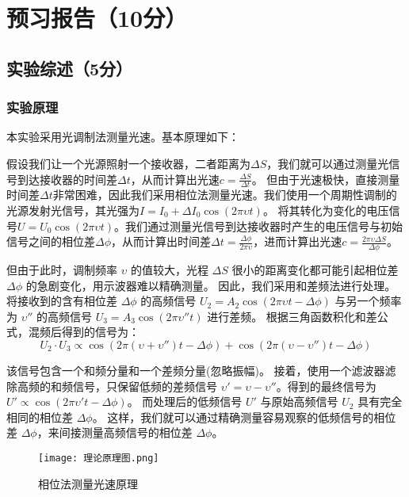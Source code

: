\documentclass{Preport}
\begin{document}
\setcounter{page}{0}
\makecover

\section{预习报告（10分）}
\subsection{实验综述（5分）}
\subsubsection{实验原理}
本实验采用光调制法测量光速。基本原理如下：

假设我们让一个光源照射一个接收器，二者距离为$\Delta S$，我们就可以通过测量光信号到达接收器的时间差$\Delta t$，从而计算出光速$c=\frac{\Delta S}{\Delta t}$。
但由于光速极快，直接测量时间差$\Delta t$非常困难，因此我们采用相位法测量光速。我们使用一个周期性调制的光源发射光信号，其光强为$I=I_0 +\Delta I_0 \cos(2\pi \upsilon t)$。
将其转化为变化的电压信号$U=U_0 \cos(2\pi \upsilon t)$。我们通过测量光信号到达接收器时产生的电压信号与初始信号之间的相位差$\Delta \phi$，从而计算出时间差$\Delta t=\frac{\Delta \phi}{2\pi \upsilon }$，进而计算出光速$c=\frac{2\pi \upsilon  \Delta S}{\Delta \phi}$。

但由于此时，调制频率 $\upsilon $ 的值较大，光程 $\Delta S$ 很小的距离变化都可能引起相位差 $\Delta \phi$ 的急剧变化，用示波器难以精确测量。
因此，我们采用和差频法进行处理。将接收到的含有相位差 $\Delta \phi$ 的高频信号 $U_2 = A_2 \cos(2\pi \upsilon t - \Delta\phi)$ 与另一个频率为 $\upsilon ''$ 的高频信号 $U_3 = A_3 \cos(2\pi \upsilon ''t)$ 进行差频。
根据三角函数积化和差公式，混频后得到的信号为：
\begin{equation}
U_2 \cdot U_3 \propto \cos(2\pi(\upsilon +\upsilon '')t - \Delta\phi) + \cos(2\pi(\upsilon -\upsilon '')t - \Delta\phi)
\end{equation}

该信号包含一个和频分量和一个差频分量(忽略振幅)。
接着，使用一个滤波器滤除高频的和频信号，只保留低频的差频信号 $\upsilon ' = \upsilon  - \upsilon ''$。得到的最终信号为 $U' \propto \cos(2\pi \upsilon 't - \Delta\phi)$。
而处理后的低频信号 $U'$ 与原始高频信号 $U_2$ 具有完全相同的相位差 $\Delta\phi$。
这样，我们就可以通过精确测量容易观察的低频信号的相位差 $\Delta\phi$，来间接测量高频信号的相位差 $\Delta\phi$。

\begin{figure}[H]
    \centering
    \texttt{[image: 理论原理图.png]}
    \caption{相位法测量光速原理}
    \label{fig:相位法原理}
\end{figure}
\end{document}
